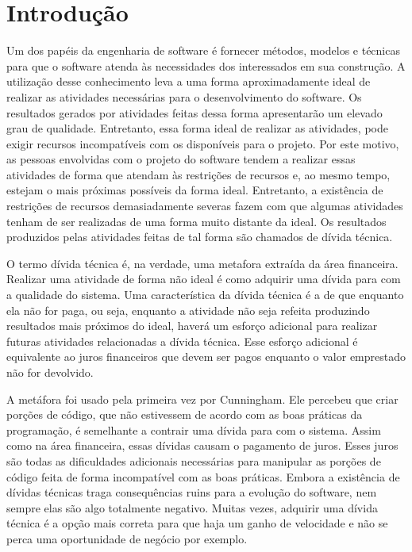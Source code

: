 \chapter{Introdução}

Um dos papéis da engenharia de software é fornecer métodos, modelos e técnicas para que o software atenda às necessidades dos interessados em sua construção. A utilização desse conhecimento leva a uma forma aproximadamente ideal de realizar as atividades necessárias para o desenvolvimento do software. Os resultados  gerados por atividades feitas dessa forma apresentarão um elevado grau de qualidade. Entretanto, essa forma ideal de realizar as atividades, pode exigir recursos incompatíveis com os disponíveis para o projeto. Por este motivo, as pessoas envolvidas com o projeto do software tendem a realizar essas atividades de forma que atendam às restrições de recursos e, ao mesmo tempo, estejam o mais próximas possíveis da forma ideal. Entretanto, a existência de restrições de recursos demasiadamente severas fazem com que algumas atividades tenham de ser realizadas de uma forma muito distante da ideal. Os resultados produzidos pelas atividades feitas de tal forma são chamados de dívida técnica. 

O termo dívida técnica é, na verdade, uma metafora extraída da área financeira. Realizar uma atividade de forma não ideal é como adquirir uma dívida para com a qualidade do sistema. Uma característica da dívida técnica é a de que enquanto ela não for paga, ou seja, enquanto a atividade não seja refeita produzindo resultados mais próximos do ideal, haverá um esforço adicional para realizar futuras atividades relacionadas a dívida técnica. Esse esforço adicional é equivalente ao juros financeiros que devem ser pagos enquanto o valor emprestado não for devolvido.  

A metáfora foi usado pela primeira vez por Cunningham\cite{cunningham1993wycash}. Ele percebeu que criar porções de código, que não estivessem de acordo com as boas práticas da programação, é semelhante a contrair uma dívida para com o sistema. Assim como na área financeira, essas dívidas causam o pagamento de juros. Esses juros são todas as dificuldades adicionais necessárias para manipular as porções de código feita de forma incompatível com as boas práticas. Embora a existência de dívidas técnicas traga consequências ruins para a evolução do software, nem sempre elas são algo totalmente negativo. Muitas vezes, adquirir uma dívida técnica é a opção mais correta para que haja um ganho de velocidade e não se perca uma oportunidade de negócio por exemplo. 

